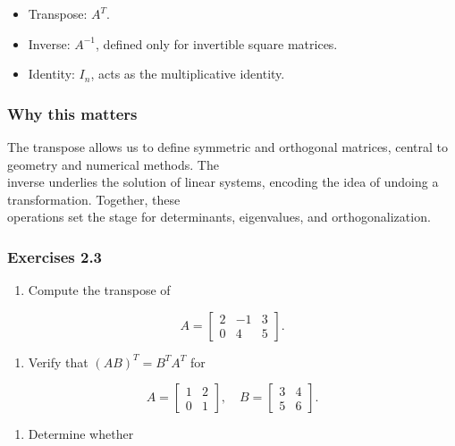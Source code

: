 \documentclass[
  12pt,
  a4paper,
]{article}
\begin{document}
\begin{itemize}
\item
  Transpose: \(A^T\).
\item
  Inverse: \(A^{-1}\), defined only for invertible square matrices.
\item
  Identity: \(I_n\), acts as the multiplicative identity.
\end{itemize}

\subsubsection{Why this matters}\label{why-this-matters-6}

The transpose allows us to define symmetric and orthogonal matrices,
central to geometry and numerical methods. The\\
inverse underlies the solution of linear systems, encoding the idea of
undoing a transformation. Together, these\\
operations set the stage for determinants, eigenvalues, and
orthogonalization.

\subsubsection{Exercises 2.3}\label{exercises-23}

\begin{enumerate}
\def\labelenumi{\arabic{enumi}.}
\item
  Compute the transpose of
\end{enumerate}

\[A = \begin{bmatrix} 2 & -1 & 3 \\ 0 & 4 & 5 \end{bmatrix}.\]

\begin{enumerate}
\def\labelenumi{\arabic{enumi}.}
\item
  Verify that \((AB)^T = B^T A^T\) for
\end{enumerate}

\[A = \begin{bmatrix}
1 & 2 \\
0 & 1 \end{bmatrix}, \quad
B = \begin{bmatrix}
3 & 4 \\
5 & 6 \end{bmatrix}.\]

\begin{enumerate}
\def\labelenumi{\arabic{enumi}.}
\item
  Determine whether
\end{enumerate}
\end{document}
